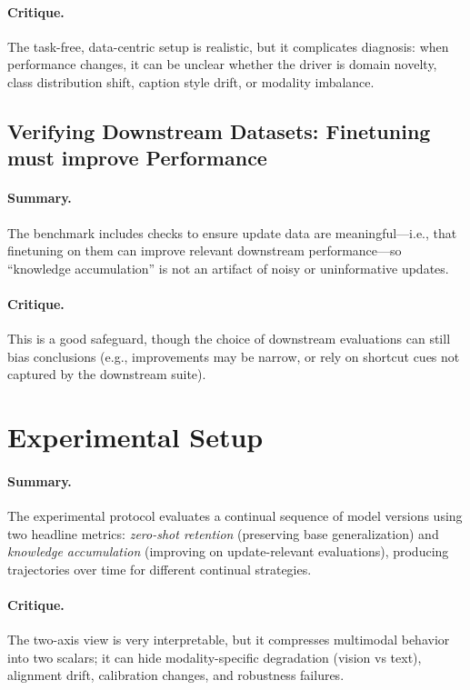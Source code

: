 \documentclass[12pt]{article}
\begin{document}
\paragraph{Critique.} The task-free, data-centric setup is realistic, but it complicates diagnosis: when
performance changes, it can be unclear whether the driver is domain novelty, class distribution shift,
caption style drift, or modality imbalance.

\subsection{Verifying Downstream Datasets: Finetuning must improve Performance}
\paragraph{Summary.} The benchmark includes checks to ensure update data are meaningful---i.e., that
finetuning on them can improve relevant downstream performance---so “knowledge accumulation” is not an
artifact of noisy or uninformative updates.
\paragraph{Critique.} This is a good safeguard, though the choice of downstream evaluations can still bias
conclusions (e.g., improvements may be narrow, or rely on shortcut cues not captured by the downstream suite).

\section{Experimental Setup}
\paragraph{Summary.} The experimental protocol evaluates a continual sequence of model versions using two
headline metrics: \emph{zero-shot retention} (preserving base generalization) and \emph{knowledge
accumulation} (improving on update-relevant evaluations), producing trajectories over time for different
continual strategies.
\paragraph{Critique.} The two-axis view is very interpretable, but it compresses multimodal behavior into two
scalars; it can hide modality-specific degradation (vision vs text), alignment drift, calibration changes,
and robustness failures.
\end{document}
